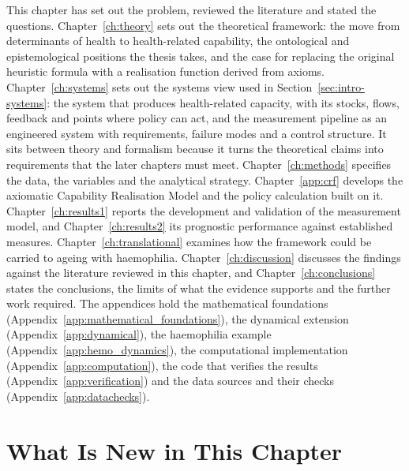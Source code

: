 This chapter has set out the problem, reviewed the literature and stated the questions. Chapter~\ref{ch:theory} sets out the theoretical framework: the move from determinants of health to health-related capability, the ontological and epistemological positions the thesis takes, and the case for replacing the original heuristic formula with a realisation function derived from axioms. Chapter~\ref{ch:systems} sets out the systems view used in Section~\ref{sec:intro-systems}: the system that produces health-related capacity, with its stocks, flows, feedback and points where policy can act, and the measurement pipeline as an engineered system with requirements, failure modes and a control structure. It sits between theory and formalism because it turns the theoretical claims into requirements that the later chapters must meet. Chapter~\ref{ch:methods} specifies the data, the variables and the analytical strategy. Chapter~\ref{app:crf} develops the axiomatic Capability Realisation Model and the policy calculation built on it. Chapter~\ref{ch:results1} reports the development and validation of the measurement model, and Chapter~\ref{ch:results2} its prognostic performance against established measures. Chapter~\ref{ch:translational} examines how the framework could be carried to ageing with haemophilia. Chapter~\ref{ch:discussion} discusses the findings against the literature reviewed in this chapter, and Chapter~\ref{ch:conclusions} states the conclusions, the limits of what the evidence supports and the further work required. The appendices hold the mathematical foundations (Appendix~\ref{app:mathematical_foundations}), the dynamical extension (Appendix~\ref{app:dynamical}), the haemophilia example (Appendix~\ref{app:hemo_dynamics}), the computational implementation (Appendix~\ref{app:computation}), the code that verifies the results (Appendix~\ref{app:verification}) and the data sources and their checks (Appendix~\ref{app:datachecks}).

\section*{What Is New in This Chapter}

